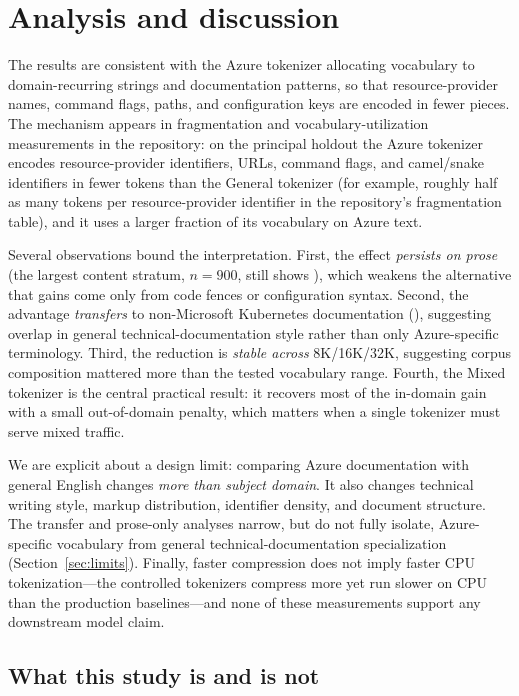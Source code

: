 \section{Analysis and discussion}
\label{sec:analysis}

The results are consistent with the Azure tokenizer allocating vocabulary to
domain-recurring strings and documentation patterns, so that resource-provider
names, command flags, paths, and configuration keys are encoded in fewer pieces.
The mechanism appears in fragmentation and vocabulary-utilization measurements in
the repository: on the principal holdout the Azure tokenizer encodes
resource-provider identifiers, URLs, command flags, and camel/snake identifiers in
fewer tokens than the General tokenizer (for example, roughly half as many tokens
per resource-provider identifier in the repository's fragmentation table), and it
uses a larger fraction of its vocabulary on Azure text.

Several observations bound the interpretation. First, the effect \emph{persists on
prose} (the largest content stratum, $n=900$, still shows ), which
weakens the alternative that gains come only from code fences or configuration
syntax. Second, the advantage \emph{transfers} to non-Microsoft Kubernetes
documentation (), suggesting overlap in general
technical-documentation style rather than only Azure-specific terminology. Third,
the reduction is \emph{stable across} 8K/16K/32K, suggesting corpus composition
mattered more than the tested vocabulary range. Fourth, the Mixed tokenizer is the
central practical result: it recovers most of the in-domain gain with a small
out-of-domain penalty, which matters when a single tokenizer must serve mixed
traffic.

We are explicit about a design limit: comparing Azure documentation with general
English changes \emph{more than subject domain}. It also changes technical writing
style, markup distribution, identifier density, and document structure. The
transfer and prose-only analyses narrow, but do not fully isolate, Azure-specific
vocabulary from general technical-documentation specialization
(Section~\ref{sec:limits}). Finally, faster compression does not imply faster CPU
tokenization---the controlled tokenizers compress more yet run slower on CPU than
the production baselines---and none of these measurements support any downstream
model claim.

\subsection*{What this study is and is not}

\noindent{}
